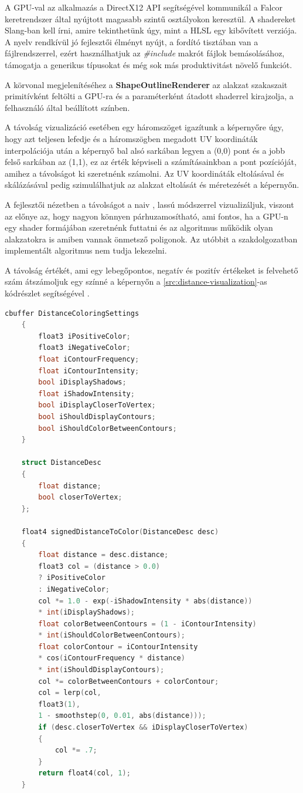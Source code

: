 A GPU-val az alkalmazás a DirectX12 API segítségével kommunikál a Falcor keretrendszer \cite{falcor} által nyújtott magasabb szintű osztályokon keresztül. A shadereket Slang-ban \cite{slang} kell írni, amire tekinthetünk úgy, mint a HLSL egy kibővített verziója. A nyelv rendkívül jó fejlesztői élményt nyújt, a fordító tisztában van a fájlrendszerrel, ezért használhatjuk az \textit{\#include} makrót fájlok bemásolásához, támogatja a generikus típusokat és még sok más produktivitást növelő funkciót.

A körvonal megjelenítéséhez a \textbf{ShapeOutlineRenderer} az alakzat szakaszait primitívként feltölti a GPU-ra és a paraméterként átadott shaderrel kirajzolja, a felhasználó által beállított színben.

A távolság vizualizáció esetében egy háromszöget igazítunk a képernyőre úgy, hogy azt teljesen lefedje és a háromszögben megadott UV koordináták interpolációja után a képernyő bal alsó sarkában legyen a (0,0) pont és a jobb felső sarkában az (1,1), ez az érték képviseli a számításainkban a pont pozícióját, amihez a távolságot ki szeretnénk számolni. Az UV koordináták eltolásával és skálázásával pedig szimulálhatjuk az alakzat eltolását és méretezését a képernyőn.

A fejlesztői nézetben a távolságot a naiv \cite{inigoquilez2d}, lassú módszerrel vizualizáljuk, viszont az előnye az, hogy nagyon könnyen párhuzamosítható, ami fontos, ha a GPU-n egy shader formájában szeretnénk futtatni és az algoritmus működik olyan alakzatokra is amiben vannak önmetsző poligonok. Az utóbbit a szakdolgozatban implementált algoritmus nem tudja lekezelni.

A távolság értékét, ami egy lebegőpontos, negatív és pozitív értékeket is felvehető szám átszámoljuk egy színné a képernyőn a \ref{src:distance-visualization}-as kódrészlet segítségével \cite{inigoquilezshader}.

\begin{lstlisting}[language=c]
	cbuffer DistanceColoringSettings
	{
		float3 iPositiveColor;
		float3 iNegativeColor;
		float iContourFrequency;
		float iContourIntensity;
		bool iDisplayShadows;
		float iShadowIntensity;
		bool iDisplayCloserToVertex;
		bool iShouldDisplayContours;
		bool iShouldColorBetweenContours;
	}

	struct DistanceDesc
	{
		float distance;
		bool closerToVertex;
	};

	float4 signedDistanceToColor(DistanceDesc desc)
	{
		float distance = desc.distance;
		float3 col = (distance > 0.0)
		? iPositiveColor
		: iNegativeColor;
		col *= 1.0 - exp(-iShadowIntensity * abs(distance))
		* int(iDisplayShadows);
		float colorBetweenContours = (1 - iContourIntensity)
		* int(iShouldColorBetweenContours);
		float colorContour = iContourIntensity
		* cos(iContourFrequency * distance)
		* int(iShouldDisplayContours);
		col *= colorBetweenContours + colorContour;
		col = lerp(col,
		float3(1),
		1 - smoothstep(0, 0.01, abs(distance)));
		if (desc.closerToVertex && iDisplayCloserToVertex)
		{
			col *= .7;
		}
		return float4(col, 1);
	}

\end{lstlisting}

